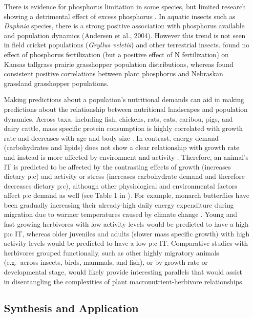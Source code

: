 \documentclass[
]{article}
\begin{document}
There is evidence for phosphorus limitation in some species, but limited
research showing a detrimental effect of excess phosphorus
\citep{cease_dietary_2016}. In aquatic insects such as \emph{Daphnia}
species, there is a strong positive association with phosphorus
available and population dynamics (Andersen et al., 2004). However this
trend is not seen in field cricket populations (\emph{Gryllus veletis})
\citep{harrison_synthesis_2014} and other terrestrial insects.
\citet{loaiza2011} found no effect of phosphorus fertilization (but a
positive effect of N fertilization) on Kansas tallgrass prairie
grasshopper population distributions, whereas \citet{joern_not_2012}
found consistent positive correlations between plant phosphorus and
Nebraskan grassland grasshopper populations.

Making predictions about a population's nutritional demands can aid in
making predictions about the relationship between nutritional landscapes
and population dynamics. Across taxa, including fish, chickens, rats,
cats, caribou, pigs, and dairy cattle, mass specific protein consumption
is highly correlated with growth rate and decreases with age and body
size \citep{talal_body_2023}. In contrast, energy demand (carbohydrates
and lipids) does not show a clear relationship with growth rate and
instead is more affected by environment and activity
\citep{talal_body_2023}. Therefore, an animal's IT is predicted to be
affected by the contrasting effects of growth (increases dietary p:c)
and activity or stress (increases carbohydrate demand and therefore
decreases dietary p:c), although other physiological and environmental
factors affect p:c demand as well (see Table 1 in
\citet{cease_how_2024}). For example, monarch butterflies have been
gradually increasing their already-high daily energy expenditure during
migration due to warmer temperatures caused by climate change
\citep{parlin_cost_2023}. Young and fast growing herbivores with low
activity levels would be predicted to have a high p:c IT, whereas older
juveniles and adults (slower mass specific growth) with high activity
levels would be predicted to have a low p:c IT. Comparative studies with
herbivores grouped functionally, such as other highly migratory animals
(e.g.~across insects, birds, mammals, and fish), or by growth rate or
developmental stage, would likely provide interesting parallels that
would assist in disentangling the complexities of plant
macronutrient-herbivore relationships.

\subsection{Synthesis and Application}\label{synthesis-and-application}
\end{document}

